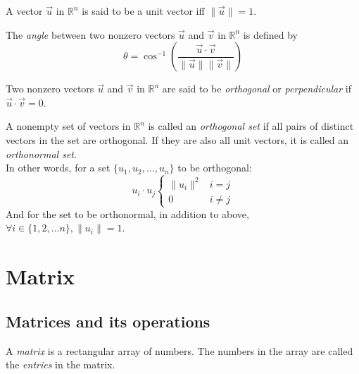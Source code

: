 \documentclass{report}
\begin{document}
		\begin{defn}
			A vector $\vec{u}$ in $\mathbb{R}^n$ is said to be a unit vector iff $\|\vec{u}\|=1$.
		\end{defn}
		
		\begin{defn}[Angle]
			The \emph{angle} between two nonzero vectors $\vec{u}$ and $\vec{v}$ in $\mathbb{R}^n$ is defined by
			\begin{displaymath}
				\theta=\cos^{-1}(\frac{\vec{u}\cdot\vec{v}}{\|\vec{u}\|\|\vec{v}\|})
			\end{displaymath}
		\end{defn}
		
		\begin{defn}
			Two nonzero vectors $\vec{u}$ and $\vec{v}$ in $\mathbb{R}^n$ are said to be \emph{orthogonal} or \emph{perpendicular} if $\vec{u} \cdot \vec{v} = 0$.
		\end{defn}
		
		\begin{defn}
			A nonempty set of vectors in $\mathbb{R}^n$ is called an \emph{orthogonal set} if all pairs of distinct vectors in the set are orthogonal. If they are also all unit vectors, it is called an \emph{orthonormal set}.\\
			In other words, for a set $\{u_1, u_2, \dots, u_n\}$ to be orthogonal:
			\begin{displaymath}
				u_i \cdot u_j
				\begin{cases}
					\|u_i\|^2 & i=j\\
					0 & i \ne j
				\end{cases}
			\end{displaymath}
			And for the set to be orthonormal, in addition to above, $\forall i \in \{1, 2, \dots n\}, \|u_i\|=1$.
		\end{defn}
	
	\section{Matrix}
		\subsection{Matrices and its operations}
			\begin{defn}[Matrix]
				A \emph{matrix} is a rectangular array of numbers. The numbers in the array are called the \emph{entries} in the matrix.
			\end{defn}
		
\end{document}
